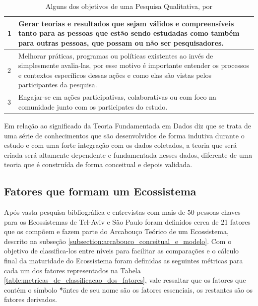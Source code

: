 \begin{table}[!htb]
	\centering
	\begin{tabular}{ | p{3cm} | p{12cm} | }
		\hline
		1 & Gerar teorias e resultados que sejam válidos e compreensíveis tanto para as pessoas que estão sendo estudadas como também para outras pessoas, que possam ou não ser pesquisadores. \\ \hline
		2 & Melhorar práticas, programas ou políticas existentes ao invés de simplesmente avalia-las, por esse motivo é importante entender os processos e contextos específicos dessas ações e como elas são vistas pelos participantes da pesquisa. \\ \hline
		3 & Engajar-se em ações participativas, colaborativas ou com foco na comunidade junto com os participates do estudo. \\ \hline
	\end{tabular}
	\caption{Alguns dos objetivos de uma Pesquisa Qualitativa, por \cite{Maxwell2013}}
	\label{table:pontos_fortes_segundo_maxwell}
\end{table}

Em relação ao significado da Teoria Fundamentada em Dados  diz que se trata de uma série de conhecimentos que são desenvolvidos de forma indutiva durante o estudo e com uma forte integração com os dados coletados, a teoria que será criada será altamente dependente e fundamentada nesses dados, diferente de uma teoria que é construída de forma conceitual e depois validada.

\subsection{Fatores que formam um Ecossistema}
\label{subsection:fatores_que_formam_um_ecossistema}

Após vasta pesquisa bibliográfica e entrevistas com mais de 50 pessoas chaves para os Ecossistemas de Tel-Aviv e São Paulo foram definidos cerca de 21 fatores que os compõem e fazem parte do Arcabouço Teórico de um Ecossistema, descrito na subseção \ref{subsection:arcabouco_conceitual_e_modelo}. Com o objetivo de classifica-los entre níveis para facilitar as comparações e o cálculo final da maturidade do Ecossistema foram definidas as seguintes métricas para cada um dos fatores representados na Tabela \ref{table:metricas_de_classificacao_dos_fatores}, vale ressaltar que os fatores que contém o símbolo \"*\" antes de seu nome são os fatores essenciais, os restantes são os fatores derivados.


